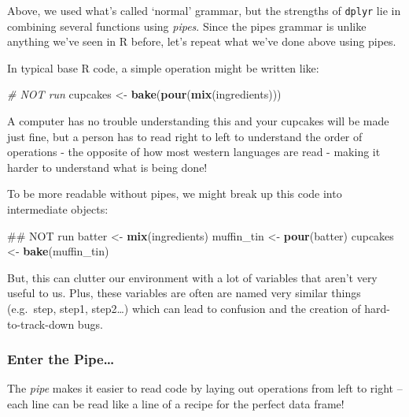 \documentclass[]{book}
\newenvironment{Shaded}{\begin{snugshade}}{\end{snugshade}}
\newcommand{\KeywordTok}[1]{\textcolor[rgb]{0.13,0.29,0.53}{\textbf{#1}}}
\newcommand{\StringTok}[1]{\textcolor[rgb]{0.31,0.60,0.02}{#1}}
\newcommand{\CommentTok}[1]{\textcolor[rgb]{0.56,0.35,0.01}{\textit{#1}}}
\newcommand{\NormalTok}[1]{#1}
\begin{document}
Above, we used what's called `normal' grammar, but the strengths of
\texttt{dplyr} lie in combining several functions using \emph{pipes}.
Since the pipes grammar is unlike anything we've seen in R before, let's
repeat what we've done above using pipes.

In typical base R code, a simple operation might be written like:

\begin{Shaded}
\begin{Highlighting}[]
\CommentTok{# NOT run}
\NormalTok{cupcakes <-}\StringTok{ }\KeywordTok{bake}\NormalTok{(}\KeywordTok{pour}\NormalTok{(}\KeywordTok{mix}\NormalTok{(ingredients)))}
\end{Highlighting}
\end{Shaded}

A computer has no trouble understanding this and your cupcakes will be
made just fine, but a person has to read right to left to understand the
order of operations - the opposite of how most western languages are
read - making it harder to understand what is being done!

To be more readable without pipes, we might break up this code into
intermediate objects:

\begin{Shaded}
\begin{Highlighting}[]
\NormalTok{## NOT run}
\NormalTok{batter <-}\StringTok{ }\KeywordTok{mix}\NormalTok{(ingredients)}
\NormalTok{muffin_tin <-}\StringTok{ }\KeywordTok{pour}\NormalTok{(batter)}
\NormalTok{cupcakes <-}\StringTok{ }\KeywordTok{bake}\NormalTok{(muffin_tin)}
\end{Highlighting}
\end{Shaded}

But, this can clutter our environment with a lot of variables that
aren't very useful to us. Plus, these variables are often are named very
similar things (e.g.~step, step1, step2\ldots{}) which can lead to
confusion and the creation of hard-to-track-down bugs.

\subsubsection*{Enter the Pipe\ldots{}}\label{enter-the-pipe}

The \emph{pipe} makes it easier to read code by laying out operations
from left to right -- each line can be read like a line of a recipe for
the perfect data frame!
\end{document}
